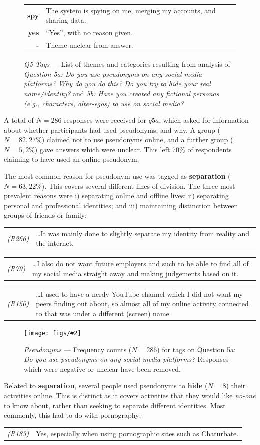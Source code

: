 \documentclass{sig-alternate}
\newcommand{\fig}[3][1.0]{
\begin{figure}[tbp]
\begin{center}
\texttt{[image: figs/\#2]}
\protect\caption{#3}
\label{fig:#2}
\end{center}
\end{figure}
}
\newcommand{\stag}[1]{\textbf{#1}}
\newcommand{\example}[2]{%

\vspace{0.10cm}

\hspace{-3.9ex} \begin{tabular}{ p{0.6cm} p{7.15cm} }
    {\it \small (R#1)} & #2 \\
\end{tabular}%
\vspace{0.10cm}

}
\begin{document}
\begin{figure}[tbp]
\begin{tabular}{ r | p{5.5cm} }
		{\bf spy} & The system is spying on me, merging my accounts, and sharing data. \\
		{\bf yes} & ``Yes'', with no reason given. \\
		{\bf -} & Theme unclear from answer. \\
    \end{tabular}
        \caption{\emph{Q5 Tags} --- List of themes and categories resulting from analysis of \emph{Question 5a: Do you use pseudonyms on any social media platforms? Why do you do this? Do you try to hide your real name/identity?} and \emph{5b: Have you created any fictional personas (e.g., characters, \emph{alter-egos}) to use on social media?}
     }%
   \label{fig:q5themes}
\end{figure}

A total of $N=286$ responses were received for $q5a$, which 
asked for information about whether participants had used pseudonyms, and why. A group ($N=82,27\%$) claimed not to use pseudonyms online, and a further group ($N=5,2\%$) gave answers which were unclear.  This left 70\% of respondents claiming to have used an online pseudonym. 

The most common reason for pseudonym use was tagged as \stag{separation} ($N=63, 22\%$). This covers several different lines of division. The three most prevalent reasons were i) separating online and offline lives; ii) separating personal and professional identities; and iii) maintaining distinction between groups of friends or family:
\example{266}{\ldots It was mainly done to slightly separate my identity from reality and the internet.}
\example{79}{\ldots I also do not want future employers and such to be able to find all of my social media straight away and making judgements based on it.}
\example{150}{\ldots I used to have a nerdy YouTube channel which I did not want my peers finding out about, so almost all of my online activity connected to that was under a different (screen) name}


\fig{q5afrequency}{\emph{Pseudonyms} --- Frequency counts ($N=286$) for tags on Question 5a: \emph{Do you use pseudonyms on any social media platforms?} Responses which were negative or unclear have been removed.}


Related to \stag{separation}, several people used pseudonyms to \stag{hide} ($N=8$) their activities online. This is distinct as it covers activities that they would like \emph{no-one} to know about, rather than seeking to separate different identities. Most commonly, this had to do with pornography:
\example{183}{Yes, especially when using pornographic sites such as Chaturbate.}
\end{document}
